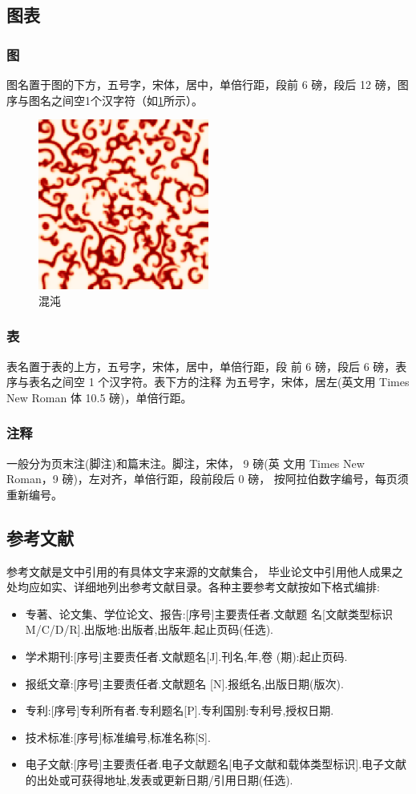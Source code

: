 \documentclass{LZU}
\begin{document}
\subsection{图表}
\subsubsection{图}
\label{ssub:figure}
图名置于图的下方，五号字，宋体，居中，单倍行距，段前 6 磅，段后 12 磅，图序与图名之间空1个汉字符（如\cref{fig:chaos}所示）。
\begin{figure}
    \centering
    \includegraphics[width=0.5\textwidth]{pic/chaos.png}
    \caption{混沌}
    \label{fig:chaos}
\end{figure}

\subsubsection{表}
表名置于表的上方，五号字，宋体，居中，单倍行距，段 前 6 磅，段后 6 磅，表序与表名之间空 1 个汉字符。表下方的注释 为五号字，宋体，居左(英文用 Times New Roman 体 10.5 磅)，单倍行距。
\subsubsection{注释}
一般分为页末注(脚注)和篇末注。脚注，宋体， 9 磅(英 文用 Times New Roman，9 磅)，左对齐，单倍行距，段前段后 0 磅， 按阿拉伯数字编号，每页须重新编号。
\subsection{参考文献}
\label{subsec:reference}
参考文献是文中引用的有具体文字来源的文献集合， 毕业论文中引用他人成果之处均应如实、详细地列出参考文献目录。各种主要参考文献按如下格式编排:
\begin{itemize}
    \item 专著、论文集、学位论文、报告:[序号]主要责任者.文献题 名[文献类型标识M/C/D/R].出版地:出版者,出版年.起止页码(任选).
    \item 学术期刊:[序号]主要责任者.文献题名[J].刊名,年,卷 (期):起止页码.
    \item 报纸文章:[序号]主要责任者.文献题名 [N].报纸名,出版日期(版次).
    \item 专利:[序号]专利所有者.专利题名[P].专利国别:专利号,授权日期.
    \item 技术标准:[序号]标准编号,标准名称[S].
    \item 电子文献:[序号]主要责任者.电子文献题名[电子文献和载体类型标识].电子文献的出处或可获得地址,发表或更新日期/引用日期(任选).
\end{itemize}
\end{document}
